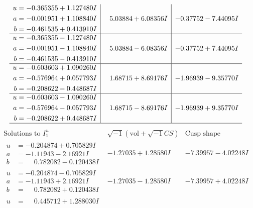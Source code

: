 \documentclass[1p]{elsarticle_modified}
\theoremstyle{definition}
\newcommand{\I}{\sqrt{-1}}
\begin{document}
$$\begin{array}{c|c|c}
\begin{aligned}
u &= -0.365355 + 1.127480 I \\
a &= -0.001951 + 1.108840 I \\
b &= -0.461535 + 0.413910 I\end{aligned}
 & \phantom{-}5.03884 + 6.08356 I & -0.37752 - 7.44095 I \\ \hline\begin{aligned}
u &= -0.365355 - 1.127480 I \\
a &= -0.001951 - 1.108840 I \\
b &= -0.461535 - 0.413910 I\end{aligned}
 & \phantom{-}5.03884 - 6.08356 I & -0.37752 + 7.44095 I \\ \hline\begin{aligned}
u &= -0.603603 + 1.090260 I \\
a &= -0.576964 + 0.057793 I \\
b &= -0.208622 - 0.448687 I\end{aligned}
 & \phantom{-}1.68715 + 8.69176 I & -1.96939 - 9.35770 I \\ \hline\begin{aligned}
u &= -0.603603 - 1.090260 I \\
a &= -0.576964 - 0.057793 I \\
b &= -0.208622 + 0.448687 I\end{aligned}
 & \phantom{-}1.68715 - 8.69176 I & -1.96939 + 9.35770 I\\
 \hline 
 \end{array}$$\newpage$$\begin{array}{c|c|c}  
\text{Solutions to }I^u_{1}& \I (\text{vol} + \sqrt{-1}CS) & \text{Cusp shape}\\
 \hline 
\begin{aligned}
u &= -0.204874 + 0.705829 I \\
a &= -1.11943 - 2.16921 I \\
b &= \phantom{-}0.782082 - 0.120438 I\end{aligned}
 & -1.27035 + 1.28580 I & -7.39957 - 4.02248 I \\ \hline\begin{aligned}
u &= -0.204874 - 0.705829 I \\
a &= -1.11943 + 2.16921 I \\
b &= \phantom{-}0.782082 + 0.120438 I\end{aligned}
 & -1.27035 - 1.28580 I & -7.39957 + 4.02248 I \\ \hline\begin{aligned}
u &= \phantom{-}0.445712 + 1.288030 I \\

\end{aligned}
\end{array}$$
\end{document}
